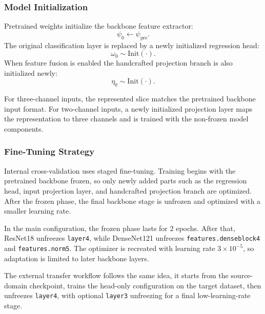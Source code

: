 \subsubsection{Model Initialization}
\label{sec:model_initialization}
Pretrained weights initialize the backbone feature extractor:
\begin{equation}
\psi_0 \leftarrow \psi_{\mathrm{pre}} .
\label{eq:method_pretrained_backbone_init}
\end{equation}
The original classification layer is replaced by a newly initialized regression head:
\begin{equation}
\omega_0 \sim \mathrm{Init}(\cdot).
\label{eq:method_head_init}
\end{equation}
When feature fusion is enabled the handcrafted projection branch is also initialized newly:
\begin{equation}
\eta_0 \sim \mathrm{Init}(\cdot).
\label{eq:method_fusion_init}
\end{equation}

For three-channel inputs, the represented slice matches the pretrained backbone input format. For two-channel inputs, a newly initialized projection layer maps the representation to three channels and is trained with the non-frozen model components.


\subsubsection{Fine-Tuning Strategy}
\label{sec:fine_tuning_strategy}
Internal cross-validation uses staged fine-tuning. Training begins with the pretrained backbone frozen, so only newly added parts such as the regression head, input projection layer, and handcrafted projection branch are optimized. After the frozen phase, the final backbone stage is unfrozen and optimized with a smaller learning rate.

In the main configuration, the frozen phase lasts for \(2\) epochs. After that, ResNet18 unfreezes \texttt{layer4}, while DenseNet121 unfreezes \texttt{features.denseblock4} and \texttt{features.norm5}. The optimizer is recreated with learning rate \(3\times10^{-5}\), so adaptation is limited to later backbone layers.

The external transfer workflow follows the same idea, it starts from the source-domain checkpoint, trains the head-only configuration on the target dataset, then unfreezes \texttt{layer4}, with optional \texttt{layer3} unfreezing for a final low-learning-rate stage.


